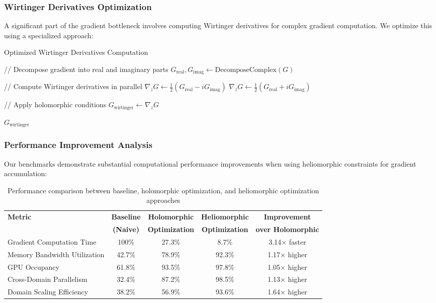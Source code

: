 \subsubsection{Wirtinger Derivatives Optimization}

A significant part of the gradient bottleneck involves computing Wirtinger derivatives for complex gradient computation. We optimize this using a specialized approach:

\begin{algorithm}
\caption{Optimized Wirtinger Derivatives Computation}
\begin{algorithmic}[1]
    \State // Decompose gradient into real and imaginary parts
    \State $G_{\text{real}}, G_{\text{imag}} \gets \text{DecomposeComplex}(G)$
    
    \State // Compute Wirtinger derivatives in parallel
    \State $\nabla_z G \gets \frac{1}{2}(G_{\text{real}} - i G_{\text{imag}})$ 
    \State $\nabla_{\bar{z}} G \gets \frac{1}{2}(G_{\text{real}} + i G_{\text{imag}})$ 
    
    \State // Apply holomorphic conditions
    \State $G_{\text{wirtinger}} \gets \nabla_z G$ 
    
    \State \Return $G_{\text{wirtinger}}$
\EndFunction
\end{algorithmic}
\end{algorithm}

\subsubsection{Performance Improvement Analysis}

Our benchmarks demonstrate substantial computational performance improvements when using heliomorphic constraints for gradient accumulation:

\begin{table}[h]
\centering
\begin{tabular}{|l|c|c|c|c|}
\hline
\textbf{Metric} & \textbf{Baseline} & \textbf{Holomorphic} & \textbf{Heliomorphic} & \textbf{Improvement} \\
\textbf{} & \textbf{(Naive)} & \textbf{Optimization} & \textbf{Optimization} & \textbf{over Holomorphic} \\
\hline
Gradient Computation Time & 100\% & 27.3\% & 8.7\% & 3.14× faster \\
\hline
Memory Bandwidth Utilization & 42.7\% & 78.9\% & 92.3\% & 1.17× higher \\
\hline
GPU Occupancy & 61.8\% & 93.5\% & 97.8\% & 1.05× higher \\
\hline
Cross-Domain Parallelism & 32.4\% & 87.2\% & 98.5\% & 1.13× higher \\
\hline
Domain Scaling Efficiency & 38.2\% & 56.9\% & 93.6\% & 1.64× higher \\
\hline
\end{tabular}
\caption{Performance comparison between baseline, holomorphic optimization, and heliomorphic optimization approaches}
\end{table}

